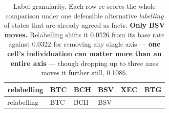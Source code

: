 \documentclass[
]{article}
\begin{document}
\begin{longtable}[]{@{}
  >{\raggedright\arraybackslash}p{}
  >{\raggedleft\arraybackslash}p{}
  >{\raggedleft\arraybackslash}p{}
  >{\raggedleft\arraybackslash}p{}
  >{\raggedleft\arraybackslash}p{}
  >{\raggedleft\arraybackslash}p{}@{}}
\caption{Label granularity. Each row re-scores the whole comparison
under one defensible alternative \emph{labelling} of states that are
already agreed as facts. \textbf{Only BSV moves.} Relabelling shifts it
0.0526 from its base rate against 0.0322 for removing any single axis
--- \textbf{one cell's individuation can matter more than an entire
axis} --- though dropping up to three axes moves it further still,
0.1086.}\tabularnewline
\toprule\noalign{}
\begin{minipage}[b]{\linewidth}\raggedright
relabelling
\end{minipage} & \begin{minipage}[b]{\linewidth}\raggedleft
BTC
\end{minipage} & \begin{minipage}[b]{\linewidth}\raggedleft
BCH
\end{minipage} & \begin{minipage}[b]{\linewidth}\raggedleft
BSV
\end{minipage} & \begin{minipage}[b]{\linewidth}\raggedleft
XEC
\end{minipage} & \begin{minipage}[b]{\linewidth}\raggedleft
BTG
\end{minipage} \\
\midrule\noalign{}
\endfirsthead
\toprule\noalign{}
\begin{minipage}[b]{\linewidth}\raggedright
relabelling
\end{minipage} & \begin{minipage}[b]{\linewidth}\raggedleft
BTC
\end{minipage} & \begin{minipage}[b]{\linewidth}\raggedleft
BCH
\end{minipage} & \begin{minipage}[b]{\linewidth}\raggedleft
BSV
\end{minipage} & \begin{minipage}[b]{\linewidth}\raggedleft

\end{minipage}
\end{longtable}
\end{document}
